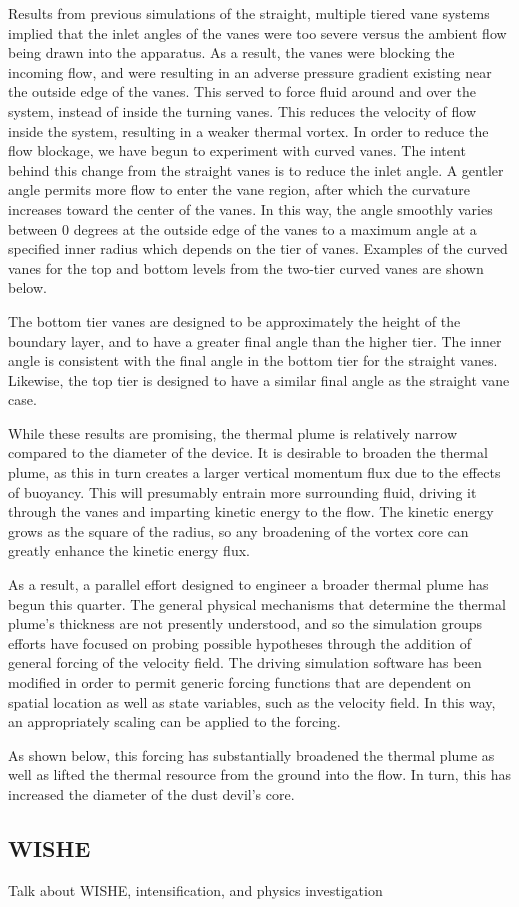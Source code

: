 Results from previous simulations of the straight, multiple tiered vane
systems implied that the inlet angles of the vanes were too severe
versus the ambient flow being drawn into the  apparatus. As a result,
the vanes were blocking the incoming flow, and were resulting in an
adverse pressure gradient existing near the outside edge of the
vanes. This served to force fluid  around and over the system, instead
of inside the turning vanes. This reduces the velocity of flow  inside
the system, resulting in a weaker thermal vortex.  In order to reduce
the flow blockage, we have begun to experiment with curved vanes. The
intent behind this change from the straight vanes is to reduce the inlet
angle. A gentler angle  permits more flow to enter the vane region,
after which the curvature increases toward the center of the vanes. In
this way, the angle smoothly varies between 0 degrees at the outside
edge of the vanes to a maximum angle at a specified inner radius which
depends on the tier of vanes.  Examples of the curved vanes for the top
and bottom levels from the two-tier curved vanes are shown below.  

The bottom tier vanes are designed to be approximately the height of the
boundary layer, and to have a greater final angle than the higher
tier. The inner angle is consistent with the final angle in the bottom
tier for the straight vanes. Likewise, the top tier is designed to have
a similar final angle as the straight vane case.

While these results are promising, the thermal plume is relatively
narrow compared to the diameter of the device. It is desirable to
broaden the thermal plume, as this in turn creates a larger vertical
momentum flux due to the effects of buoyancy. This will presumably
entrain more  surrounding fluid, driving it through the vanes and
imparting kinetic energy to the flow. The kinetic energy grows as the
square of the radius, so any broadening of the vortex core can greatly
enhance the kinetic energy flux.  

As a result, a parallel effort designed to engineer a broader thermal
plume has begun this quarter. The general physical mechanisms that
determine the thermal plume's thickness are not  presently understood,
and so the simulation groups efforts have focused on probing possible
hypotheses through the addition of general forcing of the velocity
field. The driving simulation  software has been modified in order to
permit generic forcing functions that are dependent on spatial location
as well as state variables, such as the velocity field. In this way, an
appropriately  scaling can be applied to the forcing. 

As shown below, this forcing has substantially broadened the thermal plume as well as lifted the thermal resource from the ground into the flow. In turn, this has increased the diameter of the dust devil's core.


%
%

\subsection{WISHE}

Talk about WISHE, intensification, and physics investigation
